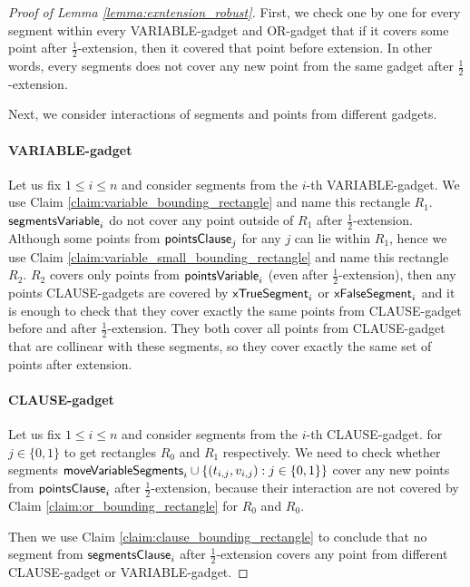 \begin{proof}[Proof of Lemma \ref{lemma:exntension_robust}]
First, we check one by one for every segment within every
VARIABLE-gadget and OR-gadget
that if it covers some point after $\frac{1}{2}$-extension,
then it covered that point before extension. In other words,
every segments does not cover any new point from
the same gadget after $\frac{1}{2}$-extension.

Next, we consider interactions of segments and points
from different gadgets.

\paragraph{VARIABLE-gadget}
Let us fix $1 \le i \le n$
and consider segments from the $i$-th VARIABLE-gadget.
We use Claim \ref{claim:variable_bounding_rectangle}
and name this rectangle $R_1$. $\mathsf{segmentsVariable}_{i}$
do not cover any point outside of $R_1$
after $\frac{1}{2}$-extension.
Although some points from $\mathsf{pointsClause}_{j}$
for any $j$ can lie within $R_1$,
hence we use Claim \ref{claim:variable_small_bounding_rectangle}
and name this rectangle $R_2$.
$R_2$ covers only points from $\mathsf{pointsVariable}_{i}$
(even after $\frac{1}{2}$-extension),
then any points CLAUSE-gadgets
are covered by $\mathsf{xTrueSegment}_{i}$ or $\mathsf{xFalseSegment}_{i}$
and it is enough to check that they cover exactly the same
points from CLAUSE-gadget before and after $\frac{1}{2}$-extension.
They both cover all points from CLAUSE-gadget that are collinear
with these segments, so they cover exactly the same set of points
after extension.

\paragraph{CLAUSE-gadget}
Let us fix $1 \le i \le n$ and consider
segments from the $i$-th CLAUSE-gadget.
for $j \in \{0, 1\}$ to get rectangles $R_0$ and $R_1$ respectively.
We need to check whether segments
$\mathsf{moveVariableSegments}_{i} \cup \{(t_{i, j}, v_{i, j}) : j \in \{0, 1\}\}$
cover any new points from $\mathsf{pointsClause}_{i}$
after $\frac{1}{2}$-extension, because their interaction
are not covered by Claim \ref{claim:or_bounding_rectangle} for $R_0$ and $R_0$.

Then we use Claim \ref{claim:clause_bounding_rectangle}
to conclude that no segment from $\mathsf{segmentsClause}_i$
after $\frac{1}{2}$-extension covers
any point from different CLAUSE-gadget or VARIABLE-gadget.
\end{proof}

